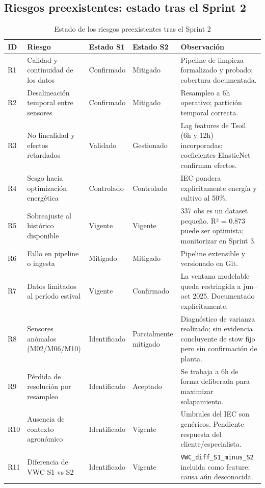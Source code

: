 \documentclass[12pt,a4paper]{article}
\begin{document}
\subsection{Riesgos preexistentes: estado tras el Sprint 2}

\begin{table}[H]
\centering
\caption{Estado de los riesgos preexistentes tras el Sprint 2}
\label{tab:riesgos_prev}
\renewcommand{\arraystretch}{1.4}
\begin{tabularx}{\textwidth}{p{0.8cm} p{3.2cm} p{2cm} p{2cm} X}
\toprule
\textbf{ID} & \textbf{Riesgo} & \textbf{Estado S1} & \textbf{Estado S2} & \textbf{Observación} \\
\midrule
R1 & Calidad y continuidad de los datos     & Confirmado & Mitigado    & Pipeline de limpieza formalizado y probado; cobertura documentada. \\
R2 & Desalineación temporal entre sensores  & Confirmado & Mitigado    & Resampleo a 6h operativo; partición temporal correcta. \\
R3 & No linealidad y efectos retardados     & Validado   & Gestionado  & Lag features de Tsoil (6h y 12h) incorporadas; coeficientes ElasticNet confirman efectos. \\
R4 & Sesgo hacia optimización energética    & Controlado & Controlado  & IEC pondera explícitamente energía y cultivo al 50\%. \\
R5 & Sobreajuste al histórico disponible    & Vigente    & Vigente     & 337 obs es un dataset pequeño. R² = 0.873 puede ser optimista; monitorizar en Sprint 3. \\
R6 & Fallo en pipeline o ingesta            & Mitigado   & Mitigado    & Pipeline extensible y versionado en Git. \\
R7 & Datos limitados al período estival     & Vigente    & Confirmado  & La ventana modelable queda restringida a jun--oct 2025. Documentado explícitamente. \\
R8 & Sensores anómalos (M02/M06/M10)        & Identificado & Parcialmente mitigado & Diagnóstico de varianza realizado; sin evidencia concluyente de stow fijo pero sin confirmación de planta. \\
R9 & Pérdida de resolución por resampleo    & Identificado & Aceptado   & Se trabaja a 6h de forma deliberada para maximizar solapamiento. \\
R10 & Ausencia de contexto agronómico       & Identificado & Vigente    & Umbrales del IEC son genéricos. Pendiente respuesta del cliente/especialista. \\
R11 & Diferencia de VWC S1 vs S2            & Identificado & Vigente    & \texttt{VWC\_diff\_S1\_minus\_S2} incluida como feature; causa aún desconocida. \\
\bottomrule
\end{tabularx}
\end{table}
\end{document}
